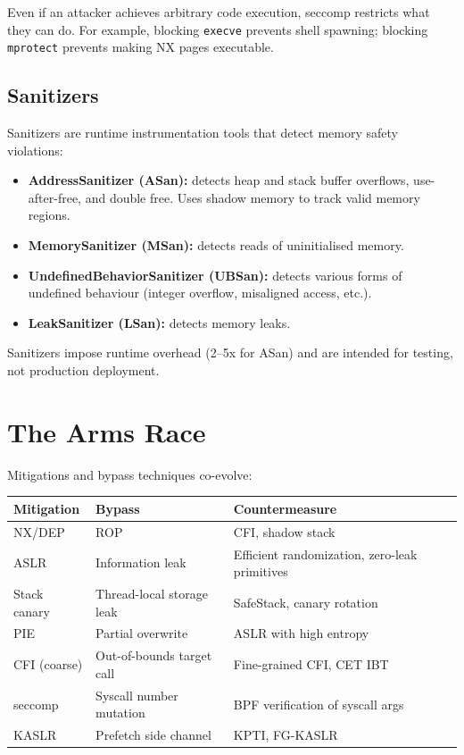 Even if an attacker achieves arbitrary code execution, seccomp restricts what they can do. For example, blocking \texttt{execve} prevents shell spawning; blocking \texttt{mprotect} prevents making NX pages executable.

\subsection{Sanitizers}

Sanitizers are runtime instrumentation tools that detect memory safety violations:

\begin{itemize}
	\item \textbf{AddressSanitizer (ASan):} detects heap and stack buffer overflows, use-after-free, and double free. Uses shadow memory to track valid memory regions.
	\item \textbf{MemorySanitizer (MSan):} detects reads of uninitialised memory.
	\item \textbf{UndefinedBehaviorSanitizer (UBSan):} detects various forms of undefined behaviour (integer overflow, misaligned access, etc.).
	\item \textbf{LeakSanitizer (LSan):} detects memory leaks.
\end{itemize}

Sanitizers impose runtime overhead (2--5x for ASan) and are intended for testing, not production deployment.

\section{The Arms Race}

Mitigations and bypass techniques co-evolve:

\begin{longtable}{p{3.5cm}p{4.5cm}p{4.5cm}}
	\toprule
	\textbf{Mitigation} & \textbf{Bypass}           & \textbf{Countermeasure}                       \\
	\midrule
	NX/DEP              & ROP                       & CFI, shadow stack                             \\
	ASLR                & Information leak          & Efficient randomization, zero-leak primitives \\
	Stack canary        & Thread-local storage leak & SafeStack, canary rotation                    \\
	PIE                 & Partial overwrite         & ASLR with high entropy                        \\
	CFI (coarse)        & Out-of-bounds target call & Fine-grained CFI, CET IBT                     \\
	seccomp             & Syscall number mutation   & BPF verification of syscall args              \\
	KASLR               & Prefetch side channel     & KPTI, FG-KASLR                                \\
	\bottomrule
\end{longtable}

